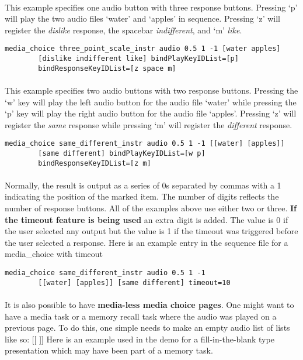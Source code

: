 \paragraph{} This example specifies one audio button with three response buttons.  Pressing `p' will play the two audio files `water' and `apples' in sequence.  Pressing `z' will register the \textit{dislike} response, the spacebar \textit{indifferent}, and `m' \textit{like}.
\begin{lstlisting}
media_choice three_point_scale_instr audio 0.5 1 -1 [water apples]
		[dislike indifferent like] bindPlayKeyIDList=[p]
		bindResponseKeyIDList=[z space m]
\end{lstlisting}

\paragraph{} This example specifies two audio buttons with two response buttons.  Pressing the `w' key will play the left audio button for the audio file `water' while pressing the `p' key will play the right audio button for the audio file `apples'.  Pressing `z' will register the \textit{same} response while pressing `m' will register the \textit{different} response.
\begin{lstlisting}
media_choice same_different_instr audio 0.5 1 -1 [[water] [apples]]
		[same different] bindPlayKeyIDList=[w p]
		bindResponseKeyIDList=[z m]
\end{lstlisting}

\paragraph{}
Normally, the result is output as a series of 0s separated by commas with a 1 indicating the position of the marked item.  The number of digits reflects the number of response buttons.  All of the examples above use either two or three.  \textbf{If the timeout feature is being used} an extra digit is added.  The value is 0 if the user selected any output but the value is 1 if the timeout was triggered before the user selected a response.  Here is an example entry in the sequence file for a media\_choice with timeout

\begin{lstlisting}
media_choice same_different_instr audio 0.5 1 -1 
		[[water] [apples]] [same different] timeout=10
\end{lstlisting}

\paragraph{}
It is also possible to have \textbf{media-less media choice pages}.  One might want to have a media task or a memory recall task where the audio was played on a previous page.  To do this, one simple needs to make an empty audio list of lists like so: [[ ]]  Here is an example used in the demo for a fill-in-the-blank type presentation which may have been part of a memory task.

